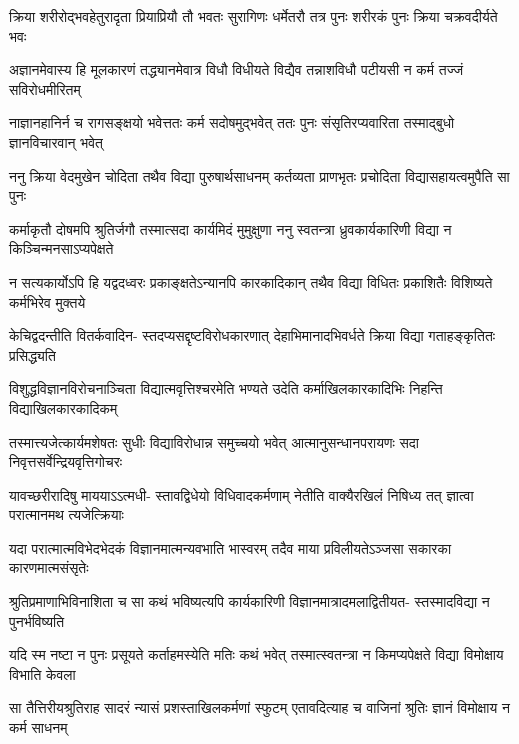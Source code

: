 \fourlineindentedshloka
{क्रिया शरीरोद्भवहेतुरादृता}
{प्रियाप्रियौ तौ भवतः सुरागिणः}
{धर्मेतरौ तत्र पुनः शरीरकं}
{पुनः क्रिया चक्रवदीर्यते भवः} %

\fourlineindentedshloka
{अज्ञानमेवास्य हि मूलकारणं}
{तद्ध्यानमेवात्र विधौ विधीयते}
{विद्यैव तन्नाशविधौ पटीयसी}
{न कर्म तज्जं सविरोधमीरितम्} %

\fourlineindentedshloka
{नाज्ञानहानिर्न च रागसङ्क्षयो}
{भवेत्ततः कर्म सदोषमुद्भवेत्}
{ततः पुनः संसृतिरप्यवारिता}
{तस्माद्बुधो ज्ञानविचारवान् भवेत्} %

\fourlineindentedshloka
{ननु क्रिया वेदमुखेन चोदिता}
{तथैव विद्या पुरुषार्थसाधनम्}
{कर्तव्यता प्राणभृतः प्रचोदिता}
{विद्यासहायत्वमुपैति सा पुनः} %

\fourlineindentedshloka
{कर्माकृतौ दोषमपि श्रुतिर्जगौ}
{तस्मात्सदा कार्यमिदं मुमुक्षुणा}
{ननु स्वतन्त्रा ध्रुवकार्यकारिणी}
{विद्या न किञ्चिन्मनसाऽप्यपेक्षते} %

\fourlineindentedshloka
{न सत्यकार्योऽपि हि यद्वदध्वरः}
{प्रकाङ्क्षतेऽन्यानपि कारकादिकान्}
{तथैव विद्या विधितः प्रकाशितैः}
{विशिष्यते कर्मभिरेव मुक्तये} %

\fourlineindentedshloka
{केचिद्वदन्तीति वितर्कवादिन-}
{स्तदप्यसद्दृष्टविरोधकारणात्}
{देहाभिमानादभिवर्धते क्रिया}
{विद्या गताहङ्कृतितः प्रसिद्ध्यति} %

\fourlineindentedshloka
{विशुद्धविज्ञानविरोचनाञ्चिता}
{विद्यात्मवृत्तिश्चरमेति भण्यते}
{उदेति कर्माखिलकारकादिभिः}
{निहन्ति विद्याखिलकारकादिकम्} %

\fourlineindentedshloka
{तस्मात्त्यजेत्कार्यमशेषतः सुधीः}
{विद्याविरोधान्न समुच्चयो भवेत्}
{आत्मानुसन्धानपरायणः सदा}
{निवृत्तसर्वेन्द्रियवृत्तिगोचरः} %

\fourlineindentedshloka
{यावच्छरीरादिषु माययाऽऽत्मधी-}
{स्तावद्विधेयो विधिवादकर्मणाम्}
{नेतीति वाक्यैरखिलं निषिध्य तत्}
{ज्ञात्वा परात्मानमथ त्यजेत्क्रियाः} %

\fourlineindentedshloka
{यदा परात्मात्मविभेदभेदकं}
{विज्ञानमात्मन्यवभाति भास्वरम्}
{तदैव माया प्रविलीयतेऽञ्जसा}
{सकारका कारणमात्मसंसृतेः} %

\fourlineindentedshloka
{श्रुतिप्रमाणाभिविनाशिता च सा}
{कथं भविष्यत्यपि कार्यकारिणी}
{विज्ञानमात्रादमलाद्वितीयत-}
{स्तस्मादविद्या न पुनर्भविष्यति} %

\fourlineindentedshloka
{यदि स्म नष्टा न पुनः प्रसूयते}
{कर्ताहमस्येति मतिः कथं भवेत्}
{तस्मात्स्वतन्त्रा न किमप्यपेक्षते}
{विद्या विमोक्षाय विभाति केवला} %

\fourlineindentedshloka
{सा तैत्तिरीयश्रुतिराह सादरं}
{न्यासं प्रशस्ताखिलकर्मणां स्फुटम्}
{एतावदित्याह च वाजिनां श्रुतिः}
{ज्ञानं विमोक्षाय न कर्म साधनम्} %

